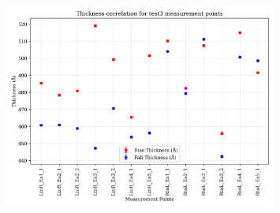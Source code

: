 \documentclass[platex,dvipdfmx,10pt,twoside,a4paper,jis2004]{jsarticle}
\begin{document}
\begin{figure}[H]
    \centering
    \includegraphics[width=0.8\textwidth]{thickness_correlation_test3.png}
    \label{fig:Correlationtest3}
\end{figure}
\clearpage
\end{document}
